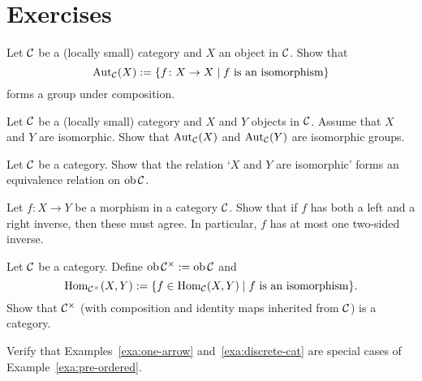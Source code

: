\section*{Exercises}

\begin{exercise}
Let ${\mathcal{C}}$ be a (locally small) category and $X$ an object in ${\mathcal{C}}$. Show that
\[
	\operatorname{\mathrm{Aut}}_{\mathcal{C}}(X) := \{ f\colon X\to X \mid \text{$f$ is an isomorphism} \}
\]
forms a group under composition.
\end{exercise}

\begin{exercise}
Let ${\mathcal{C}}$ be a (locally small) category and $X$ and $Y$ objects in ${\mathcal{C}}$. Assume that $X$ and $Y$ are isomorphic. Show that $\operatorname{\mathrm{Aut}}_{\mathcal{C}}(X)$ and $\operatorname{\mathrm{Aut}}_{\mathcal{C}}(Y)$ are isomorphic groups.
\end{exercise}

\begin{exercise}
Let ${\mathcal{C}}$ be a category. Show that the relation `$X$ and $Y$ are isomorphic' forms an equivalence relation on $\operatorname{ob} {\mathcal{C}}$.
\end{exercise}

\begin{exercise}
Let $f\colon X\to Y$ be a morphism in a category ${\mathcal{C}}$. Show that if $f$ has both a left and a right inverse, then these must agree. In particular, $f$ has at most one two-sided inverse.
\end{exercise}

\begin{exercise}\label{exc:iso-category}
Let ${\mathcal{C}}$ be a category. Define $\operatorname{ob} {\mathcal{C}}^\times := \operatorname{ob} {\mathcal{C}}$ and
\[
	\operatorname{Hom}_{{\mathcal{C}}^\times}(X,Y) := \{ f \in \operatorname{Hom}_{\mathcal{C}}(X,Y) \mid \text{$f$ is an isomorphism} \}.
\]
Show that ${\mathcal{C}}^\times$ (with composition and identity maps inherited from ${\mathcal{C}}$) is a category.
\end{exercise}

\begin{exercise}Verify that Examples~\ref{exa:one-arrow}  and~\ref{exa:discrete-cat} are special cases of Example~\ref{exa:pre-ordered}.
\end{exercise}

%
%

